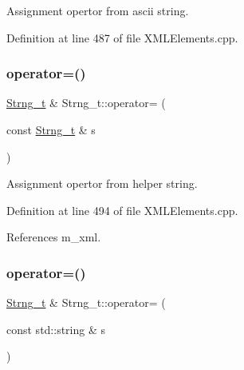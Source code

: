 Assignment opertor from ascii string. 



Definition at line 487 of file X\+M\+L\+Elements.\+cpp.

\hypertarget{class_d_d4hep_1_1_x_m_l_1_1_strng__t_a27581bce0d2c52f93ca9cf5151779c5d}{}\label{class_d_d4hep_1_1_x_m_l_1_1_strng__t_a27581bce0d2c52f93ca9cf5151779c5d} 
\subsubsection{\texorpdfstring{operator=()}{operator=()}\hspace{0.1cm}{\footnotesize\ttfamily [3/4]}}
{\footnotesize\ttfamily \hyperlink{class_d_d4hep_1_1_x_m_l_1_1_strng__t}{Strng\+\_\+t} \& Strng\+\_\+t\+::operator= (\begin{DoxyParamCaption}\item[{const \hyperlink{class_d_d4hep_1_1_x_m_l_1_1_strng__t}{Strng\+\_\+t} \&}]{s }\end{DoxyParamCaption})}



Assignment opertor from helper string. 



Definition at line 494 of file X\+M\+L\+Elements.\+cpp.



References m\+\_\+xml.

\hypertarget{class_d_d4hep_1_1_x_m_l_1_1_strng__t_a07a428c2011b4dfff17ef71bfe77e572}{}\label{class_d_d4hep_1_1_x_m_l_1_1_strng__t_a07a428c2011b4dfff17ef71bfe77e572} 
\subsubsection{\texorpdfstring{operator=()}{operator=()}\hspace{0.1cm}{\footnotesize\ttfamily [4/4]}}
{\footnotesize\ttfamily \hyperlink{class_d_d4hep_1_1_x_m_l_1_1_strng__t}{Strng\+\_\+t} \& Strng\+\_\+t\+::operator= (\begin{DoxyParamCaption}\item[{const std\+::string \&}]{s }\end{DoxyParamCaption})}



